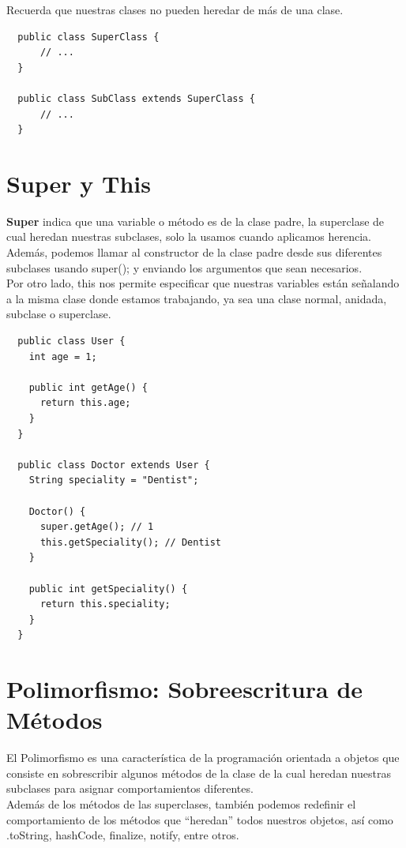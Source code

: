 \documentclass{article}
\begin{document}
Recuerda que nuestras clases no pueden heredar de más de una clase.\\

\begin{verbatim}
  public class SuperClass {
      // ...
  }

  public class SubClass extends SuperClass {
      // ...
  }
\end{verbatim}


\section{Super y This}%
\textbf{Super} indica que una variable o método es de la clase padre, la
superclase de cual heredan nuestras subclases, solo la usamos cuando aplicamos
herencia.\\

Además, podemos llamar al constructor de la clase padre desde sus diferentes
subclases usando super(); y enviando los argumentos que sean necesarios.\\

Por otro lado, this nos permite especificar que nuestras variables están
señalando a la misma clase donde estamos trabajando, ya sea una clase normal,
anidada, subclase o superclase.\\

\begin{verbatim}
  public class User {
    int age = 1;

    public int getAge() {
      return this.age;
    }
  }

  public class Doctor extends User {
    String speciality = "Dentist";

    Doctor() {
      super.getAge(); // 1
      this.getSpeciality(); // Dentist
    }

    public int getSpeciality() {
      return this.speciality;
    }
  }
\end{verbatim}


\section{Polimorfismo: Sobreescritura de Métodos}%
El Polimorfismo es una característica de la programación orientada a objetos
que consiste en sobrescribir algunos métodos de la clase de la cual heredan
nuestras subclases para asignar comportamientos diferentes.\\

Además de los métodos de las superclases, también podemos redefinir el
comportamiento de los métodos que “heredan” todos nuestros objetos, así como
.toString, hashCode, finalize, notify, entre otros.\\
\end{document}
